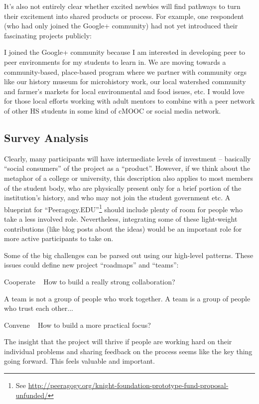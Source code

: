 \documentclass[twoside]{article}
\begin{document}
\begin{multicols}{2}
It's also not entirely clear whether excited newbies will find pathways to turn their excitement into shared products or process. For example, one respondent (who had only joined the Google+ community) had not yet introduced their fascinating projects publicly:

I joined the Google+ community because I am interested in developing peer to peer environments for my students to learn in. We are moving towards a community-based, place-based program where we partner with community orgs like our history museum for microhistory work, our local watershed community and farmer's markets for local environmental and food issues, etc. I would love for those local efforts working with adult mentors to combine with a peer network of other HS students in some kind of cMOOC or social media network.

\subsection{Survey Analysis}

Clearly, many participants will have intermediate levels of investment -- basically ``social consumers'' of the project as a ``product''. However, if we think about the metaphor of a college or university, this description also applies to most members of the student body, who are physically present only for a brief portion of the institution's history, and who may not join the student government etc. A blueprint for ``Peeragogy.EDU''\footnote{See \url{http://peeragogy.org/knight-foundation-prototype-fund-proposal-unfunded/}} should include plenty of room for people who take a less involved role. Nevertheless, integrating some of these light-weight contributions (like blog posts about the ideas) would be an important role for more active participants to take on.

Some of the big challenges can be parsed out using our high-level patterns. These issues could define new project ``roadmaps'' and ``teams'':

    Cooperate ~ How to build a really strong collaboration?

        A team is not a group of people who work together. A team is a group of people who trust each other...

    Convene ~ How to build a more practical focus?

        The insight that the project will thrive if people are working hard on their individual problems and sharing feedback on the process seems like the key thing going forward. This feels valuable and important.


\end{multicols}
\end{document}
